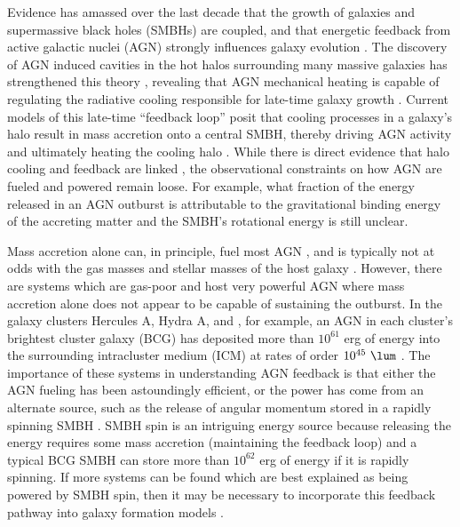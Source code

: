 \documentclass[iop]{emulateapj}
\begin{document}
Evidence has amassed over the last decade that the growth of galaxies
and supermassive black holes (SMBHs) are coupled, and that energetic
feedback from active galactic nuclei (AGN) strongly influences galaxy
evolution \citep[\eg][]{1995ARA&A..33..581K, magorrian,
  1998A&A...331L...1S, 2000MNRAS.311..576K, 2000ApJ...539L...9F,
  2000ApJ...539L..13G, 2002ApJ...574..740T}. The discovery of AGN
induced cavities in the hot halos surrounding many massive galaxies
has strengthened this theory \citep[see][for a review]{mcnamrev},
revealing that AGN mechanical heating is capable of regulating the
radiative cooling responsible for late-time galaxy growth
\citep[\eg][]{birzan04, dunn06, rafferty06}. Current models of this
late-time ``feedback loop'' posit that cooling processes in a galaxy's
halo result in mass accretion onto a central SMBH, thereby driving AGN
activity and ultimately heating the cooling halo
\citep[\eg][]{croton06, bower06, sijacki07}. While there is direct
evidence that halo cooling and feedback are linked
\citep[\eg][]{haradent, rafferty08}, the observational constraints on
how AGN are fueled and powered remain loose. For example, what
fraction of the energy released in an AGN outburst is attributable to
the gravitational binding energy of the accreting matter
\citep[see][for a review]{1984RvMP...56..255B} and the SMBH's
rotational energy \citep[see][for a review]{2002NewAR..46..247M} is
still unclear.

Mass accretion alone can, in principle, fuel most AGN
\citep[\eg][]{pizzolato05, 2006MNRAS.372...21A}, and is typically not
at odds with the gas masses and stellar masses of the host galaxy
\citep[\eg][]{rafferty06}. However, there are systems which are
gas-poor and host very powerful AGN where mass accretion alone does
not appear to be capable of sustaining the outburst. In the galaxy
clusters Hercules A, Hydra A, and \ms, for example, an AGN in each
cluster's brightest cluster galaxy (BCG) has deposited more than
$10^{61}$ erg of energy into the surrounding intracluster medium (ICM)
at rates of order $10^{45} ~\lum$ \citep{herca, hydraa, ms0735}. The
importance of these systems in understanding AGN feedback is that
either the AGN fueling has been astoundingly efficient, or the power
has come from an alternate source, such as the release of angular
momentum stored in a rapidly spinning SMBH \citep[\eg][]{msspin,
  minaspin}. SMBH spin is an intriguing energy source because
releasing the energy requires some mass accretion (maintaining the
feedback loop) and a typical BCG SMBH can store more than $10^{62}$
erg of energy if it is rapidly spinning. If more systems can be found
which are best explained as being powered by SMBH spin, then it may be
necessary to incorporate this feedback pathway into galaxy formation
models \citep[\eg][]{2003ApJ...585L.101H, 2007ApJ...658..815S,
  2009MNRAS.397.1302B, gesspin}.
\end{document}
